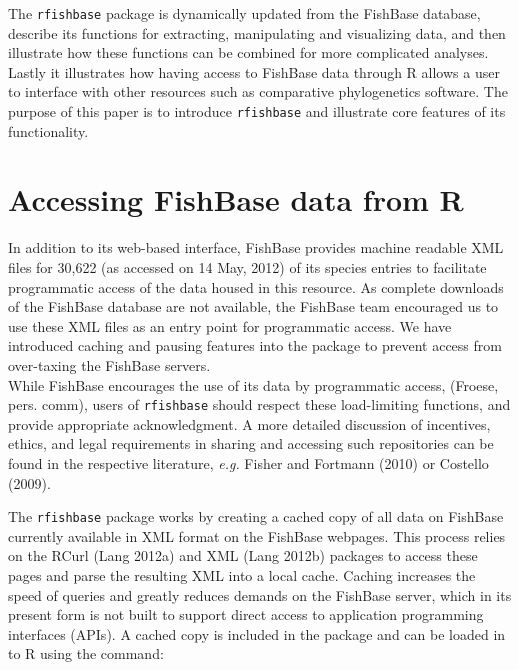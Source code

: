 \documentclass[author-year]{elsarticle} %
\begin{document}
The \texttt{rfishbase} package is dynamically updated from the FishBase
database, describe its functions for extracting, manipulating and
visualizing data, and then illustrate how these functions can be
combined for more complicated analyses. Lastly it illustrates how having
access to FishBase data through R allows a user to interface with other
resources such as comparative phylogenetics software. The purpose of
this paper is to introduce \texttt{rfishbase} and illustrate core
features of its functionality.

\section{Accessing FishBase data from R}

In addition to its web-based interface, FishBase provides machine
readable XML files for 30,622 (as accessed on 14 May, 2012) of its
species entries to facilitate programmatic access of the data housed in
this resource. As complete downloads of the FishBase database are not
available, the FishBase team encouraged us to use these XML files as an
entry point for programmatic access. We have introduced caching and
pausing features into the package to prevent access from over-taxing the
FishBase servers.\\While FishBase encourages the use of its data by
programmatic access, (Froese, pers. comm), users of \texttt{rfishbase}
should respect these load-limiting functions, and provide appropriate
acknowledgment. A more detailed discussion of incentives, ethics, and
legal requirements in sharing and accessing such repositories can be
found in the respective literature, \emph{e.g.} Fisher and Fortmann
(2010) or Costello (2009).

The \texttt{rfishbase} package works by creating a cached copy of all
data on FishBase currently available in XML format on the FishBase
webpages. This process relies on the RCurl (Lang 2012a) and XML (Lang
2012b) packages to access these pages and parse the resulting XML into a
local cache. Caching increases the speed of queries and greatly reduces
demands on the FishBase server, which in its present form is not built
to support direct access to application programming interfaces (APIs). A
cached copy is included in the package and can be loaded in to R using
the command:
\end{document}
